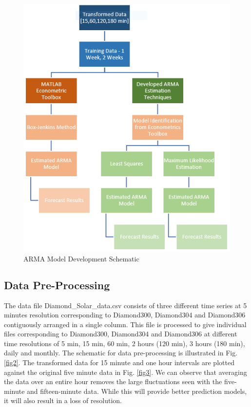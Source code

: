 \documentclass[journal]{IEEEtran}
\begin{document}
\begin{figure}[H]
\centering
\includegraphics[scale=0.45]{ObjectivesSchematic.png}
\caption{ARMA Model Development Schematic}
\label{fig1} %
\end{figure}

\subsection{Data Pre-Processing}



The data file Diamond\_Solar\_data.csv consists of three different time series at 5 minutes resolution corresponding to Diamond300, Diamond304 and Diamond306 contiguously arranged in a single column. This file is processed to give individual files corresponding to Diamond300, Diamond304 and Diamond306 at different time resolutions of 5 min, 15 min, 60 min, 2 hours (120 min), 3 hours (180 min), daily and monthly. The schematic for data pre-processing is illustrated in Fig. \ref{fig2}. The transformed data for 15 minute and one hour intervals are plotted against the original five minute data in Fig. \ref{fig3}. We can observe that averaging the data over an entire hour removes the large fluctuations seen with the five-minute and fifteen-minute data. While this will provide better prediction models, it will also result in a loss of resolution.
\end{document}
